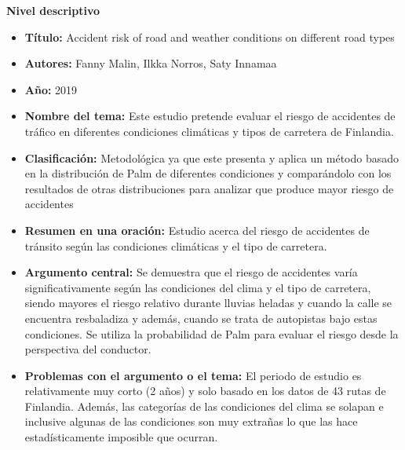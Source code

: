 \documentclass[12pt]{article}
\begin{document}
\textbf{Nivel descriptivo} 
\begin{itemize}
    \item \textbf{Título:} Accident risk of road and weather conditions on different road types
    
	\item \textbf{Autores:} Fanny Malin, Ilkka Norros, Saty Innamaa 
    
	\item \textbf{Año:} 2019
    
	\item \textbf{Nombre del tema:} Este estudio pretende evaluar el riesgo de accidentes de tráfico en diferentes condiciones climáticas y tipos de carretera de Finlandia.
	
    \item \textbf{Clasificación:} Metodológica ya que este presenta y aplica un método basado en la distribución de Palm de diferentes condiciones y comparándolo con los resultados de otras distribuciones para analizar que produce mayor riesgo de accidentes    
	
    \item \textbf{Resumen en una oración:} Estudio acerca del riesgo de accidentes de tránsito según las condiciones climáticas y el tipo de carretera. 

    \item \textbf{Argumento central:} Se demuestra que el riesgo de accidentes varía significativamente según las condiciones del clima y el tipo de carretera, siendo mayores el riesgo relativo durante lluvias heladas y cuando la calle se encuentra resbaladiza y además, cuando se trata de autopistas bajo estas condiciones. Se utiliza la probabilidad de Palm para evaluar el riesgo desde la perspectiva del conductor.  
 
    \item \textbf{Problemas con el argumento o el tema:} El periodo de estudio es relativamente muy corto (2 años) y solo basado en los datos de 43 rutas de Finlandia. Además, las categorías de las condiciones del clima se solapan e inclusive algunas de las condiciones son muy extrañas lo que las hace estadísticamente imposible que ocurran.  \\
\end{itemize}
\end{document}
